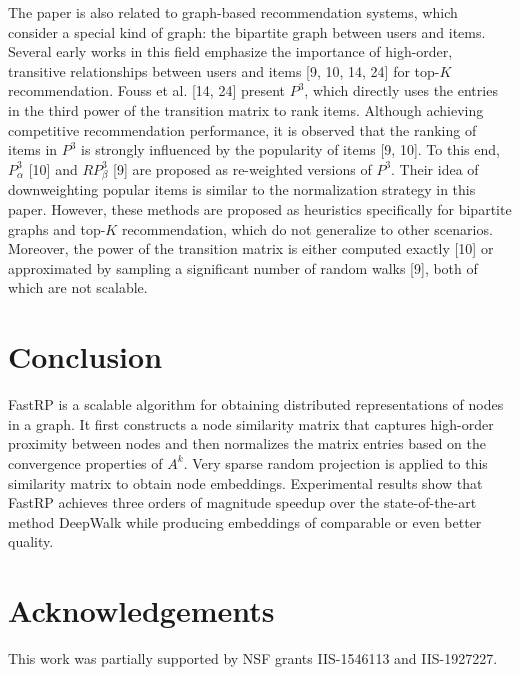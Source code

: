 \documentclass[11pt]{article}
\begin{document}
The paper is also related to graph-based recommendation systems, which consider a special kind of graph: the bipartite graph between users and items. Several early works in this field emphasize the importance of high-order, transitive relationships between users and items [9, 10, 14, 24] for top-$K$ recommendation. Fouss et al. [14, 24] present $P^3$, which directly uses the entries in the third power of the transition matrix to rank items. Although achieving competitive recommendation performance, it is observed that the ranking of items in $P^3$ is strongly influenced by the popularity of items [9, 10]. To this end, $P^3_\alpha$ [10] and $RP^3_\beta$ [9] are proposed as re-weighted versions of $P^3$. Their idea of downweighting popular items is similar to the normalization strategy in this paper. However, these methods are proposed as heuristics specifically for bipartite graphs and top-$K$ recommendation, which do not generalize to other scenarios. Moreover, the power of the transition matrix is either computed exactly [10] or approximated by sampling a significant number of random walks [9], both of which are not scalable.

\section{Conclusion}

FastRP is a scalable algorithm for obtaining distributed representations of nodes in a graph. It first constructs a node similarity matrix that captures high-order proximity between nodes and then normalizes the matrix entries based on the convergence properties of $A^k$. Very sparse random projection is applied to this similarity matrix to obtain node embeddings. Experimental results show that FastRP achieves three orders of magnitude speedup over the state-of-the-art method DeepWalk while producing embeddings of comparable or even better quality.

\section*{Acknowledgements}

This work was partially supported by NSF grants IIS-1546113 and IIS-1927227.
\end{document}
